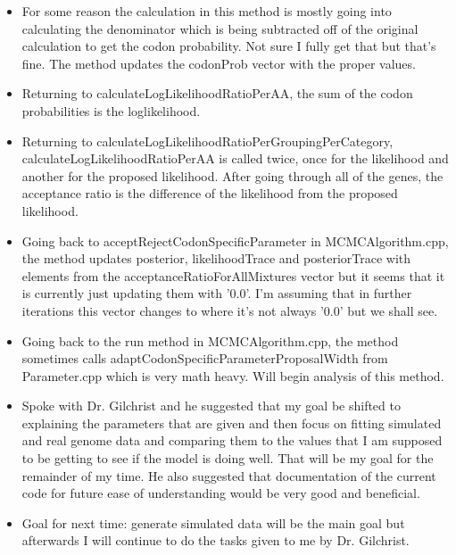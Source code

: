 \documentclass[letterpaper,index=totoc,hyperref,openany]{labbook} %
\begin{document}
\begin{itemize}
	\item For some reason the calculation in this method is mostly going into calculating the denominator which is being subtracted off of the original calculation to get the codon probability. Not sure I fully get that but that's fine. The method updates the codonProb vector with the proper values.

	\item Returning to calculateLogLikelihoodRatioPerAA, the sum of the codon probabilities is the loglikelihood.

	\item Returning to calculateLogLikelihoodRatioPerGroupingPerCategory, calculateLogLikelihoodRatioPerAA is called twice, once for the likelihood and another for the proposed likelihood. After going through all of the genes, the acceptance ratio is the difference of the likelihood from the proposed likelihood.

	\item Going back to acceptRejectCodonSpecificParameter in MCMCAlgorithm.cpp, the method updates posterior, likelihoodTrace and posteriorTrace with elements from the acceptanceRatioForAllMixtures vector but it seems that it is currently just updating them with '0.0'. I'm assuming that in further iterations this vector changes to where it's not always '0.0' but we shall see.

	\item Going back to the run method in MCMCAlgorithm.cpp, the method sometimes calls adaptCodonSpecificParameterProposalWidth from Parameter.cpp which is very math heavy. Will begin analysis of this method.

	\item Spoke with Dr. Gilchrist and he suggested that my goal be shifted to explaining the parameters that are given and then focus on fitting simulated and real genome data and comparing them to the values that I am supposed to be getting to see if the model is doing well. That will be my goal for the remainder of my time. He also suggested that documentation of the current code for future ease of understanding would be very good and beneficial.

	\item Goal for next time: generate simulated data will be the main goal but afterwards I will continue to do the tasks given to me by Dr. Gilchrist.

\end{itemize}



\printbibliography
\end{document}
